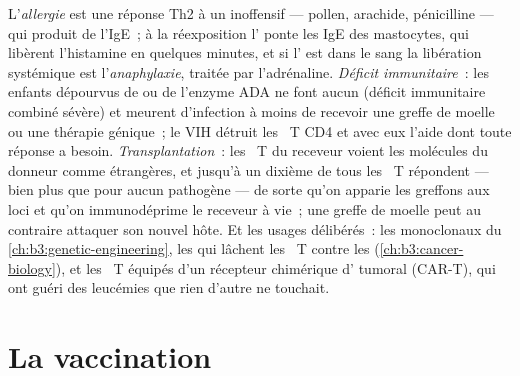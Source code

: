 \begin{example}\label{ex:b3:adaptive-immunity:failures}
L'\emph{allergie} est une réponse Th2 à un  inoffensif ---
pollen, arachide, pénicilline --- qui produit de l'IgE~; à la
réexposition l' ponte les IgE des mastocytes, qui libèrent
l'histamine en quelques minutes, et si l' est dans le sang la
libération systémique est l'\emph{anaphylaxie}, traitée par
l'adrénaline. \emph{Déficit immunitaire}~: les enfants dépourvus de 
ou de l'enzyme ADA ne font aucun  (déficit immunitaire combiné
sévère) et meurent d'infection à moins de recevoir une greffe de moelle
ou une thérapie génique~; le VIH détruit les ~T CD4 et avec
eux l'aide dont toute réponse a besoin. \emph{Transplantation}~: les
~T du receveur voient les molécules  du donneur comme
étrangères, et jusqu'à un dixième de tous les ~T répondent
--- bien plus que pour aucun pathogène --- de sorte qu'on apparie les
greffons aux loci  et qu'on immunodéprime le receveur à vie~; une
greffe de moelle peut au contraire attaquer son nouvel hôte. Et les
usages délibérés~: les  monoclonaux du
\cref{ch:b3:genetic-engineering}, les 
qui lâchent les ~T contre les 
(\cref{ch:b3:cancer-biology}), et les ~T équipés d'un
récepteur chimérique d' tumoral (CAR-T), qui ont guéri des
leucémies que rien d'autre ne touchait.
\end{example}

\section{La vaccination}

